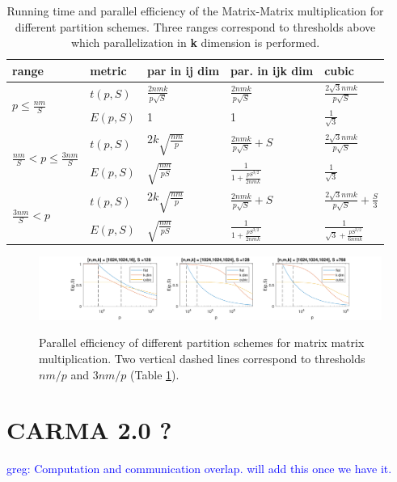 \documentclass[sigconf]{acmart}
\newcommand\greg[1]{\textcolor{blue}{greg: #1}}
\begin{document}
\begin{table}[t]
	\label{tab:mmmEfficiency}
	\caption{Running time and parallel efficiency of the Matrix-Matrix 
		multiplication for different partition schemes. Three ranges correspond 
		to thresholds above which parallelization in \textbf{k} dimension is 
		performed.}
	\begin{tabular}{l|l|l|l|l}
		range & metric & par in \textbf{ij} dim &par. 
		in \textbf{ijk} dim & cubic \\
		\hline
		\multirow{2}{*}{$p \le \frac{nm}{S}$} & $t(p,S)$ & 
		$\frac{2nmk}{p\sqrt{S}}$ & $\frac{2nmk}{p\sqrt{S}}$ & 
		$\frac{2\sqrt{3}nmk}{p\sqrt{S}}$ \\
		& $E(p,S)$ & 1 & 1 & 	$\frac{1}{\sqrt{3}}$\\
		\hline
		\multirow{2}{*}{$\frac{nm}{S} < p \le \frac{3nm}{S}$} & $t(p,S)$ & $2k 
		\sqrt{\frac{nm}{p}}$ & 
		$\frac{2nmk}{p\sqrt{S}} + S$ &  $\frac{2\sqrt{3}nmk}{p\sqrt{S}}$  
		\\		
		& $E(p,S)$ & $\sqrt{\frac{nm}{pS}}$ & $\frac{1}{1 + 
			\frac{pS^{3/2}}{2nmk}}$ & 	$\frac{1}{\sqrt{3}}$ \\
		\hline
		\multirow{2}{*}{$\frac{3nm}{S} < p$} & $t(p,S)$ & $2k 
		\sqrt{\frac{nm}{p}}$ & 
		$\frac{2nmk}{p\sqrt{S}} + S$ & $\frac{2\sqrt{3}nmk}{p\sqrt{S}} + 
		\frac{S}{3}$\\
		& $E(p,S)$ &	$\sqrt{\frac{nm}{pS}}$ & $\frac{1}{1 + 
			\frac{pS^{3/2}}{2nmk}}$ &	$\frac{1}{\sqrt{3} + 
			\frac{pS^{3/2}}{6nmk}}$
	\end{tabular}
\end{table}


\begin{figure}[t]
	\hspace*{-1.5cm}
	\includegraphics[width=2.5\columnwidth]{figures/mmmScaling}
	\label{fig:mmmScaling}
	\caption{Parallel efficiency of different partition schemes for matrix 
		matrix multiplication. Two vertical dashed lines correspond to 
		thresholds 
		$nm/p$ and $3nm/p$ (Table \ref{tab:mmmEfficiency}).}
\end{figure}

\section{CARMA 2.0 ?}
 \greg{Computation and communication overlap. will add this once we have it.}
\end{document}
